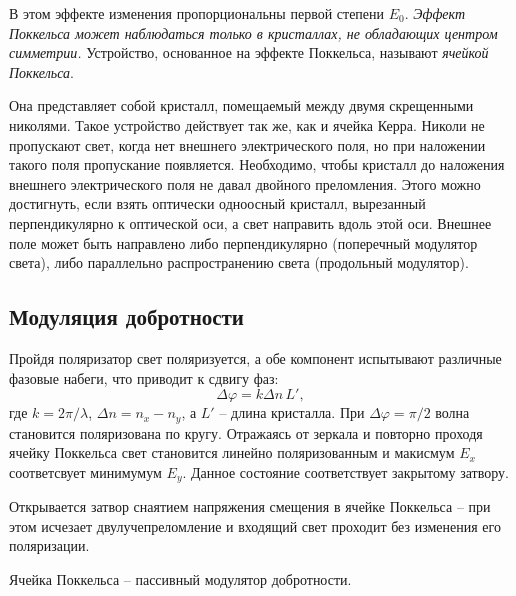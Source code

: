 В этом эффекте изменения пропорциональны первой степени $E_0$. \textit{Эффект Поккельса может наблюдаться только в 
кристаллах, не обладающих центром симметрии.} Устройство, основанное на эффекте Поккельса, называют \textit{ячейкой Поккельса}. 

Она представляет собой кристалл, помещаемый между двумя скрещенными николями. 
Такое устройство действует так же, как и ячейка Керра. Николи
не пропускают свет, когда нет внешнего электрического поля,
но при наложении такого поля пропускание появляется. 
Необходимо, чтобы кристалл до наложения внешнего электрического
поля не давал двойного преломления. Этого можно достигнуть,
если взять оптически одноосный кристалл, вырезанный 
перпендикулярно к оптической оси, а свет направить вдоль этой оси.
Внешнее поле может быть направлено либо перпендикулярно
(поперечный модулятор света), либо параллельно 
распространению света (продольный модулятор).



\subsection{Модуляция добротности}


Пройдя поляризатор свет поляризуется, а обе компонент испытывают различные фазовые набеги, что приводит к сдвигу фаз:
\begin{equation*}
    \Delta \varphi = k \Delta n\, L',
\end{equation*}
где $k = 2\pi/\lambda$, $\Delta n = n_x - n_y$, а $L'$ -- длина кристалла. При $\Delta \varphi = \pi/2$ волна становится поляризована по кругу. Отражаясь от зеркала и повторно проходя ячейку Поккельса свет становится линейно поляризованным и макисмум $E_x$ соответсвует минимумум $E_y$. Данное состояние соответствует закрытому затвору. 

Открывается затвор снаятием напряжения смещения в ячейке Поккельса -- при этом исчезает двулучепреломление и входящий свет проходит без изменения его поляризации. 

Ячейка Поккельса -- пассивный модулятор добротности. 


